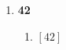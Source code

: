 \documentclass{article}
\begin{document}
\begin{enumerate}
    \item \textbf{42}
        \begin{enumerate}
            \item $[42]$
        \end{enumerate}
\end{enumerate}
\end{document}
